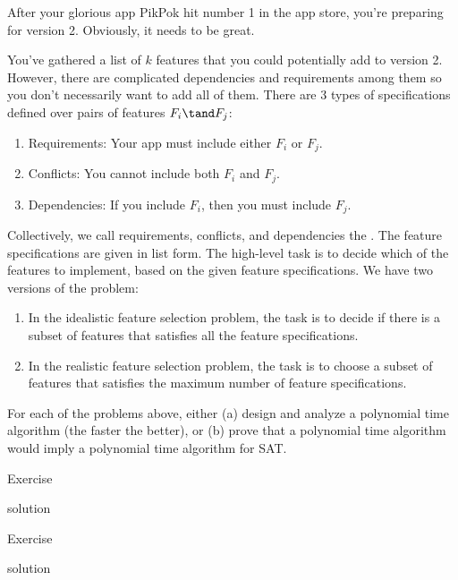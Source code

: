 \documentclass{article}
\begin{document}
 After your glorious app PikPok hit number 1 in the app store, you're
preparing for version 2.
Obviously, it needs to be great.

You've gathered a list of $k$ features  that you could potentially add to version 2.
However, there are complicated dependencies and requirements among them so you don't necessarily want to add all of them.
There are 3 types of specifications defined over pairs of features $F_i \tand F_j$: \begin{enumerate}
  \item Requirements: Your app must include either $F_i$ or $F_j$.
  \item Conflicts: You cannot include both $F_i$ and $F_j$.
  \item Dependencies: If you include $F_i$, then you must include $F_j$.
\end{enumerate}
Collectively, we call requirements, conflicts, and dependencies the .
The feature specifications are given in list form.
The high-level task is to decide which of the features to implement, based on the given feature specifications.
We have two versions of the problem: \begin{enumerate}
  \item In the idealistic feature selection problem, the task is to decide if there is a subset of features that satisfies all the feature specifications.
  \item In the realistic feature selection problem, the task is to choose a subset of
  features that satisfies the maximum number of feature specifications.
\end{enumerate}
For each of the problems above, either (a) design and analyze a polynomial time algorithm (the faster the better), or (b) prove that a polynomial time algorithm would imply a polynomial time algorithm for SAT.
\setcounter{section}{10}
\setcounter{exercise}{3}
\begin{subexercise}
Exercise
\end{subexercise}

\begin{solution}
solution
\end{solution}
\pagebreak

\begin{subexercise}
Exercise
\end{subexercise}

\begin{solution}
solution
\end{solution}
\end{document}

